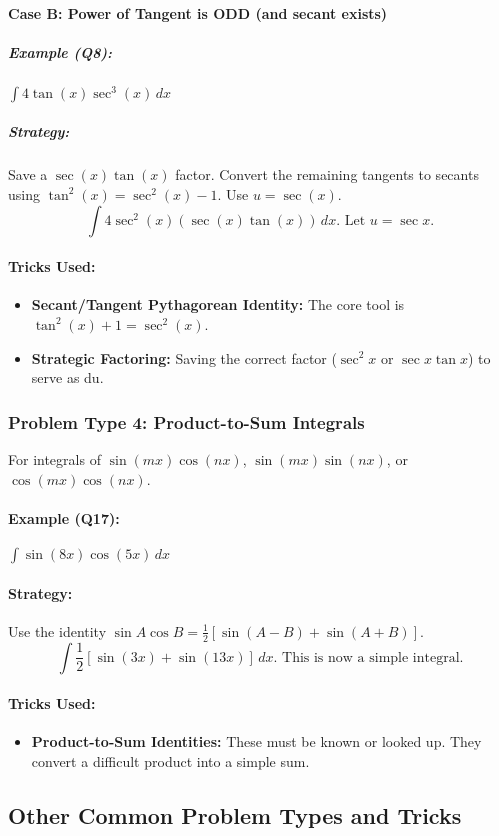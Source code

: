 \documentclass{article}
\begin{document}
\paragraph{Case B: Power of Tangent is ODD (and secant exists)}
\subparagraph{Example (Q8):} $ \int 4\tan(x)\sec^3(x) \,dx $
\subparagraph{Strategy:} Save a $\sec(x)\tan(x)$ factor. Convert the remaining tangents to secants using $\tan^2(x) = \sec^2(x)-1$. Use $u=\sec(x)$.
\[ \int 4\sec^2(x)(\sec(x)\tan(x)) \,dx. \text{ Let } u=\sec x. \]
\paragraph{Tricks Used:}
\begin{itemize}
    \item \textbf{Secant/Tangent Pythagorean Identity:} The core tool is $\tan^2(x)+1 = \sec^2(x)$.
    \item \textbf{Strategic Factoring:} Saving the correct factor ($\sec^2x$ or $\sec x \tan x$) to serve as du.
\end{itemize}

\subsubsection{Problem Type 4: Product-to-Sum Integrals}
For integrals of $\sin(mx)\cos(nx)$, $\sin(mx)\sin(nx)$, or $\cos(mx)\cos(nx)$.
\paragraph{Example (Q17):} $ \int \sin(8x)\cos(5x) \,dx $
\paragraph{Strategy:} Use the identity $\sin A \cos B = \frac{1}{2}[\sin(A-B) + \sin(A+B)]$.
\[ \int \frac{1}{2}[\sin(3x) + \sin(13x)] \,dx. \text{ This is now a simple integral.} \]
\paragraph{Tricks Used:}
\begin{itemize}
    \item \textbf{Product-to-Sum Identities:} These must be known or looked up. They convert a difficult product into a simple sum.
\end{itemize}

\subsection{Other Common Problem Types and Tricks}
\end{document}
